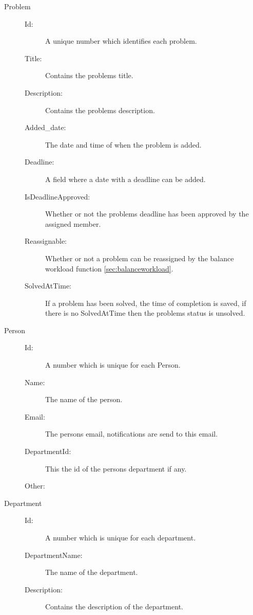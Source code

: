 \begin{description}
\item[Problem]\hfill
\begin{description}
\item[Id:] A unique number which identifies each problem. 
\item[Title:] Contains the problems title.
\item[Description:] Contains the problems description.
\item[Added\_date:] The date and time of when the problem is added.
\item[Deadline:] A field where a date with a deadline can be added.
\item[IsDeadlineApproved:] Whether or not the problems deadline has been approved by the assigned \astaff[] member.
\item[Reassignable:] Whether or not a problem can be reassigned by the balance workload function \ref{sec:balanceworkload}. 
\item[SolvedAtTime:] If a problem has been solved, the time of completion is saved, if there is no SolvedAtTime then the problems status is unsolved.
\end{description}
\end{description}

\begin{description}
\item[Person]\hfill
\begin{description}
\item[Id:] A number which is unique for each Person. 
\item[Name:] The name of the person.
\item[Email:] The persons email, notifications are send to this email.  
\item[DepartmentId:] This the id of the persons department if any. 
\item[Other:] 
\end{description}
\end{description}

\begin{description}
\item[Department]\hfill
\begin{description}
\item[Id:] A number which is unique for each department. 
\item[DepartmentName:] The name of the department.
\item[Description:] Contains the description of the department.
\end{description}
\end{description}

